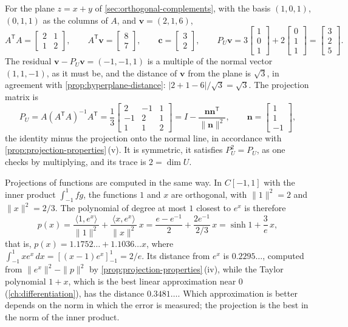 For the plane $z=x+y$ of \cref{sec:orthogonal-complements}, with the basis $(1,0,1)$, $(0,1,1)$ as the columns of $A$, and $\mathbf v=(2,1,6)$,
\[
A^{\mathsf T}A=\begin{bmatrix}2&1\\1&2\end{bmatrix},\qquad A^{\mathsf T}\mathbf v=\begin{bmatrix}8\\7\end{bmatrix},\qquad\mathbf c=\begin{bmatrix}3\\2\end{bmatrix},\qquad P_U\mathbf v=3\begin{bmatrix}1\\0\\1\end{bmatrix}+2\begin{bmatrix}0\\1\\1\end{bmatrix}=\begin{bmatrix}3\\2\\5\end{bmatrix}.
\]
The residual $\mathbf v-P_U\mathbf v=(-1,-1,1)$ is a multiple of the normal vector $(1,1,-1)$, as it must be, and the distance of $\mathbf v$ from the plane is $\sqrt3$, in agreement with \cref{prop:hyperplane-distance}: $|2+1-6|/\sqrt3=\sqrt3$. The projection matrix is
\[
P_U=A(A^{\mathsf T}A)^{-1}A^{\mathsf T}=\frac13\begin{bmatrix}2&-1&1\\-1&2&1\\1&1&2\end{bmatrix}=I-\frac{\mathbf n\mathbf n^{\mathsf T}}{\|\mathbf n\|^2},\qquad\mathbf n=\begin{bmatrix}1\\1\\-1\end{bmatrix},
\]
the identity minus the projection onto the normal line, in accordance with \cref{prop:projection-properties}\,(v). It is symmetric, it satisfies $P_U^2=P_U$, as one checks by multiplying, and its trace is $2=\dim U$.

Projections of functions are computed in the same way. In $C[-1,1]$ with the inner product $\int_{-1}^1fg$, the functions $1$ and $x$ are orthogonal, with $\|1\|^2=2$ and $\|x\|^2=2/3$. The polynomial of degree at most $1$ closest to $e^x$ is therefore
\[
p(x)=\frac{\langle1,e^x\rangle}{\|1\|^2}+\frac{\langle x,e^x\rangle}{\|x\|^2}\,x=\frac{e-e^{-1}}2+\frac{2e^{-1}}{2/3}\,x=\sinh1+\frac3e\,x ,
\]
that is, $p(x)=1.1752\ldots+1.1036\ldots x$,
where $\int_{-1}^1xe^x\,dx=[(x-1)e^x]_{-1}^1=2/e$. Its distance from $e^x$ is $0.2295\ldots$, computed from $\|e^x\|^2-\|p\|^2$ by \cref{prop:projection-properties}\,(iv), while the Taylor polynomial $1+x$, which is the best linear approximation near $0$ (\cref{ch:differentiation}), has the distance $0.3481\ldots$. Which approximation is better depends on the norm in which the error is measured; the projection is the best in the norm of the inner product.

